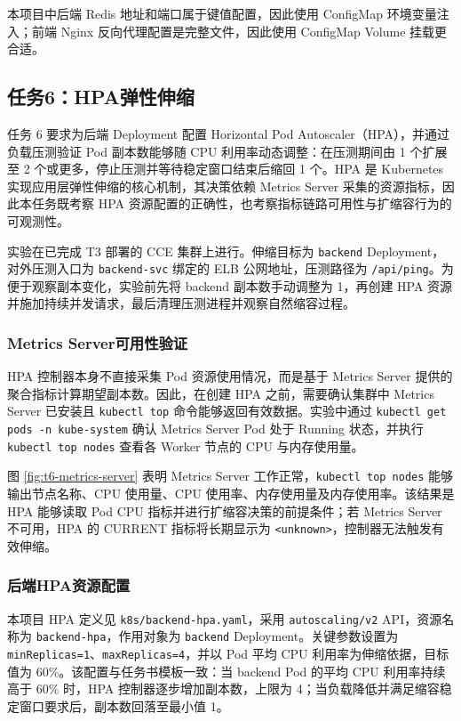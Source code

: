 本项目中后端 Redis 地址和端口属于键值配置，因此使用 ConfigMap 环境变量注入；前端 Nginx 反向代理配置是完整文件，因此使用 ConfigMap Volume 挂载更合适。

\subsection{任务6：HPA弹性伸缩}

任务 6 要求为后端 Deployment 配置 Horizontal Pod Autoscaler（HPA），并通过负载压测验证 Pod 副本数能够随 CPU 利用率动态调整：在压测期间由 1 个扩展至 2 个或更多，停止压测并等待稳定窗口结束后缩回 1 个。HPA 是 Kubernetes 实现应用层弹性伸缩的核心机制，其决策依赖 Metrics Server 采集的资源指标，因此本任务既考察 HPA 资源配置的正确性，也考察指标链路可用性与扩缩容行为的可观测性。

实验在已完成 T3 部署的 CCE 集群上进行。伸缩目标为 \verb|backend| Deployment，对外压测入口为 \verb|backend-svc| 绑定的 ELB 公网地址，压测路径为 \verb|/api/ping|。为便于观察副本变化，实验前先将 backend 副本数手动调整为 1，再创建 HPA 资源并施加持续并发请求，最后清理压测进程并观察自然缩容过程。

\subsubsection{Metrics Server可用性验证}

HPA 控制器本身不直接采集 Pod 资源使用情况，而是基于 Metrics Server 提供的聚合指标计算期望副本数。因此，在创建 HPA 之前，需要确认集群中 Metrics Server 已安装且 \verb|kubectl top| 命令能够返回有效数据。实验中通过 \verb|kubectl get pods -n kube-system| 确认 Metrics Server Pod 处于 Running 状态，并执行 \verb|kubectl top nodes| 查看各 Worker 节点的 CPU 与内存使用量。


图 \ref{fig:t6-metrics-server} 表明 Metrics Server 工作正常，\verb|kubectl top nodes| 能够输出节点名称、CPU 使用量、CPU 使用率、内存使用量及内存使用率。该结果是 HPA 能够读取 Pod CPU 指标并进行扩缩容决策的前提条件；若 Metrics Server 不可用，HPA 的 CURRENT 指标将长期显示为 \verb|<unknown>|，控制器无法触发有效伸缩。

\subsubsection{后端HPA资源配置}

本项目 HPA 定义见 \verb|k8s/backend-hpa.yaml|，采用 \verb|autoscaling/v2| API，资源名称为 \verb|backend-hpa|，作用对象为 \verb|backend| Deployment。关键参数设置为 \verb|minReplicas=1|、\verb|maxReplicas=4|，并以 Pod 平均 CPU 利用率为伸缩依据，目标值为 60\%。该配置与任务书模板一致：当 backend Pod 的平均 CPU 利用率持续高于 60\% 时，HPA 控制器逐步增加副本数，上限为 4；当负载降低并满足缩容稳定窗口要求后，副本数回落至最小值 1。

